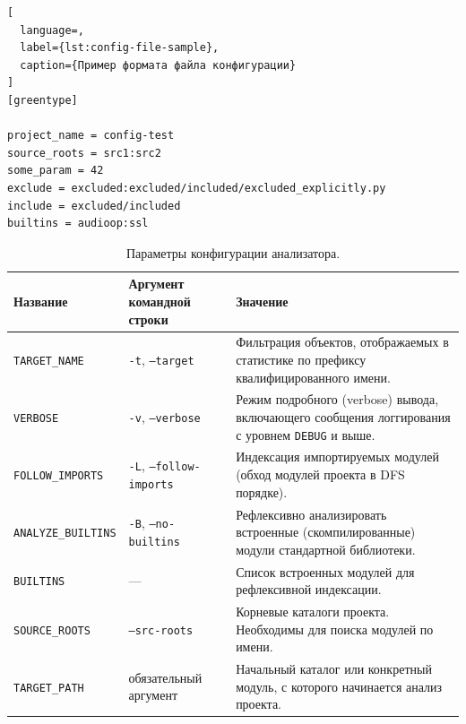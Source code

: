 \begin{lstlisting}[
  language=,
  label={lst:config-file-sample},
  caption={Пример формата файла конфигурации}
]
[greentype]

project_name = config-test
source_roots = src1:src2
some_param = 42
exclude = excluded:excluded/included/excluded_explicitly.py
include = excluded/included
builtins = audioop:ssl
\end{lstlisting}

\begin{table}[H]
  \small
  \caption{Параметры конфигурации анализатора.}
  \label{tab:config-ref}
  \begin{tabularx}{\textwidth}{ |X|X|X| }
    \hline
    Название & Аргумент командной строки & Значение \\
    \hline
    \texttt{TARGET\_NAME} & \texttt{-t}, \texttt{--target} &  Фильтрация
    объектов, отображаемых в статистике по префиксу квалифицированного имени.
    \\ \hline

    \texttt{VERBOSE} & \texttt{-v}, \texttt{--verbose} & Режим подробного
    (verbose) вывода, включающего сообщения логгирования с уровнем
    \texttt{DEBUG} и выше.
    \\ \hline

    \texttt{FOLLOW\_IMPORTS} & \texttt{-L}, \texttt{--follow-imports} & 
    Индексация импортируемых модулей (обход модулей проекта в DFS порядке).
    \\ \hline

    \texttt{ANALYZE\_BUILTINS} & \texttt{-B}, \texttt{--no-builtins} &
    Рефлексивно анализировать встроенные (скомпилированные) модули стандартной
    библиотеки.
    \\ \hline

    \texttt{BUILTINS} & --- & Список встроенных модулей для рефлексивной
    индексации.
    \\ \hline
    
    \texttt{SOURCE\_ROOTS} & \texttt{--src-roots} & Корневые каталоги проекта.
    Необходимы для поиска модулей по имени.  
    \\ \hline

    \texttt{TARGET\_PATH} & обязательный аргумент & Начальный каталог или
    конкретный модуль, с которого начинается анализ проекта.
    \\ \hline

  \end{tabularx}
\end{table}

